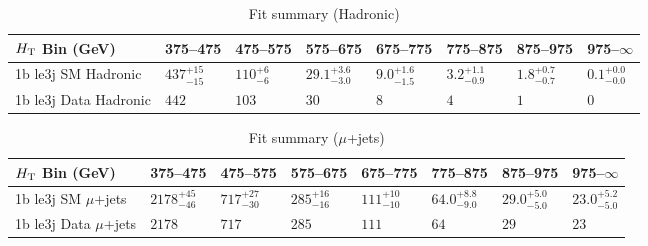 \documentclass[8pt]{article}
\def\scalht{\mbox{$H_{\rm{T}}$}\xspace}
\newcommand\T{\rule{0pt}{2.6ex}}
\begin{document}
\begin{table}[ht!]
\caption{Fit summary (Hadronic)}
\label{tab:ensemble-summary}
\centering
\begin{tabular}{ llllllll }

\hline
\scalht Bin (GeV)       & 375--475                       & 475--575                       & 575--675                       & 675--775                       & 775--875                       & 875--975                       & 975--$\infty$                  \\ [1.000000ex]
\hline
1b le3j SM Hadronic\T   & $437^{+15}_{-15}$              & $110^{+6}_{-6}$                & $29.1^{+3.6}_{-3.0}$           & $9.0^{+1.6}_{-1.5}$            & $3.2^{+1.1}_{-0.9}$            & $1.8^{+0.7}_{-0.7}$            & $0.1^{+0.0}_{-0.0}$            \\ 
1b le3j Data Hadronic\T & $442$                          & $103$                          & $30$                           & $8$                            & $4$                            & $1$                            & $0$                            \\ 
\hline

\end{tabular}
\end{table}
\begin{table}[ht!]
\caption{Fit summary ($\mu$+jets)}
\label{tab:ensemble-summary}
\centering
\begin{tabular}{ llllllll }

\hline
\scalht Bin (GeV)       & 375--475                       & 475--575                       & 575--675                       & 675--775                       & 775--875                       & 875--975                       & 975--$\infty$                  \\ [1.000000ex]
\hline
1b le3j SM $\mu$+jets\T & $2178^{+45}_{-46}$             & $717^{+27}_{-30}$              & $285^{+16}_{-16}$              & $111^{+10}_{-10}$              & $64.0^{+8.8}_{-9.0}$           & $29.0^{+5.0}_{-5.0}$           & $23.0^{+5.2}_{-5.0}$           \\ 
1b le3j Data $\mu$+jets\T & $2178$                         & $717$                          & $285$                          & $111$                          & $64$                           & $29$                           & $23$                           \\ 
\hline

\end{tabular}
\end{table}
\end{document}

